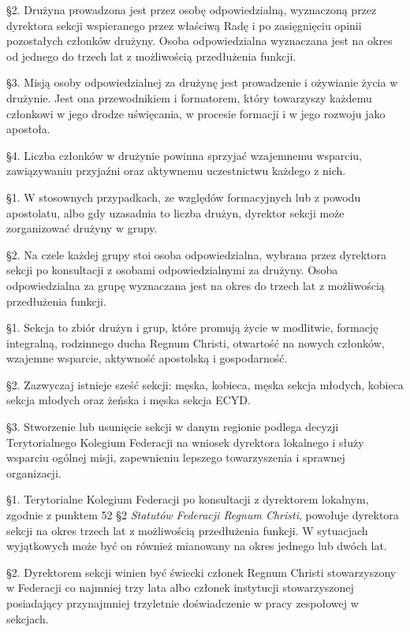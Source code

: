 \S{}2. Drużyna prowadzona jest przez osobę odpowiedzialną, wyznaczoną przez dyrektora sekcji wspieranego przez właściwą Radę i po zasięgnięciu opinii pozostałych członków drużyny. Osoba odpowiedzialna wyznaczana jest na okres od jednego do trzech lat z możliwością przedłużenia funkcji.

\S{}3. Misją osoby odpowiedzialnej za drużynę jest prowadzenie i ożywianie życia w drużynie. Jest ona przewodnikiem i formatorem, który towarzyszy każdemu członkowi w jego drodze uświęcania, w procesie formacji i w jego rozwoju jako apostoła.

\S{}4. Liczba członków w drużynie powinna sprzyjać wzajemnemu wsparciu, zawiązywaniu przyjaźni oraz aktywnemu uczestnictwu każdego z nich.


 \S{}1. W stosownych przypadkach, ze względów formacyjnych lub z powodu apostolatu, albo gdy uzasadnia to liczba drużyn, dyrektor sekcji może zorganizować drużyny w grupy.

\S{}2. Na czele każdej grupy stoi osoba odpowiedzialna, wybrana przez dyrektora sekcji po konsultacji z osobami odpowiedzialnymi za drużyny. Osoba odpowiedzialna za grupę wyznaczana jest na okres do trzech lat z możliwością przedłużenia funkcji.


 \S{}1. Sekcja to zbiór drużyn i grup, które promują życie w modlitwie, formację integralną, rodzinnego ducha Regnum Christi, otwartość na nowych członków, wzajemne wsparcie, aktywność apostolską i gospodarność.

\S{}2. Zazwyczaj istnieje sześć sekcji: męska, kobieca, męska sekcja młodych, kobieca sekcja młodych oraz żeńska i męska sekcja ECYD.

\S{}3. Stworzenie lub usunięcie sekcji w danym regionie podlega decyzji Terytorialnego Kolegium Federacji na wniosek dyrektora lokalnego i służy wsparciu ogólnej misji, zapewnieniu lepszego towarzyszenia i sprawnej organizacji.


 \S{}1. Terytorialne Kolegium Federacji po konsultacji z dyrektorem lokalnym, zgodnie z punktem 52 \S{}2 {\em Statutów Federacji Regnum Christi}, powołuje dyrektora sekcji na okres trzech lat z możliwością przedłużenia funkcji. W sytuacjach wyjątkowych może być on również mianowany na okres jednego lub dwóch lat.

\S{}2. Dyrektorem sekcji winien być świecki członek Regnum Christi stowarzyszony w Federacji co najmniej trzy lata albo członek instytucji stowarzyszonej posiadający przynajmniej trzyletnie doświadczenie w pracy zespołowej w sekcjach.


